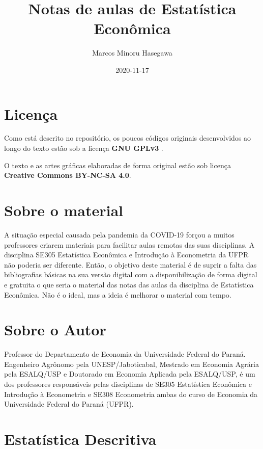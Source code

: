 \documentclass[
]{book}
\title{Notas de aulas de Estatística Econômica}
\author{Marcos Minoru Hasegawa}
\date{2020-11-17}
\begin{document}
\maketitle

{
\setcounter{tocdepth}{1}
\tableofcontents
}
\hypertarget{licenuxe7a}{%
\chapter*{Licença}\label{licenuxe7a}}

Como está descrito no repositório, os poucos códigos originais desenvolvidos ao longo do texto estão sob a licença \textbf{GNU GPLv3} .

O texto e as artes gráficas elaboradas de forma original estão sob licença \textbf{Creative Commons BY-NC-SA 4.0}.

\hypertarget{sobre-o-material}{%
\chapter*{Sobre o material}\label{sobre-o-material}}

A situação especial causada pela pandemia da COVID-19 forçou a muitos professores criarem materiais para facilitar aulas remotas das suas disciplinas. A disciplina SE305 Estatística Econômica e Introdução à Econometria da UFPR não poderia ser diferente. Então, o objetivo deste material é de suprir a falta das bibliografias básicas na sua versão digital com a disponibilização de forma digital e gratuita o que seria o material das notas das aulas da disciplina de Estatística Econômica. Não é o ideal, mas a ideia é melhorar o material com tempo.

\hypertarget{sobre-o-autor}{%
\chapter*{Sobre o Autor}\label{sobre-o-autor}}

Professor do Departamento de Economia da Universidade Federal do Paraná. Engenheiro Agrônomo pela UNESP/Jaboticabal, Mestrado em Economia Agrária pela ESALQ/USP e Doutorado em Economia Aplicada pela ESALQ/USP, é um dos professores responsáveis pelas disciplinas de SE305 Estatística Econômica e Introdução à Econometria e SE308 Econometria ambas do curso de Economia da Universidade Federal do Paraná (UFPR).

\hypertarget{estatuxedstica-descritiva}{%
\chapter{Estatística Descritiva}\label{estatuxedstica-descritiva}}
\end{document}

